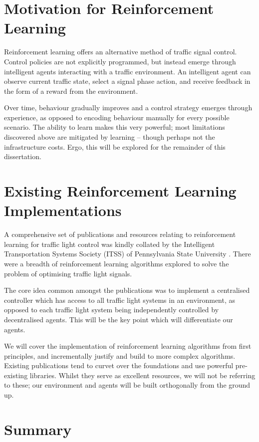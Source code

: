 \documentclass[a4paper]{report}
\begin{document}
\section{Motivation for Reinforcement Learning}

Reinforcement learning offers an alternative method of traffic signal control. Control policies are not explicitly programmed, but instead emerge through intelligent agents interacting with a traffic environment. An intelligent agent can observe current traffic state, select a signal phase action, and receive feedback in the form of a reward from the environment.

Over time, behaviour gradually improves and a control strategy emerges through experience, as opposed to encoding behaviour manually for every possible scenario. The ability to learn makes this very powerful; most limitations discovered above are mitigated by learning -- though perhaps not the infrastructure costs. Ergo, this will be explored for the remainder of this dissertation.

\section{Existing Reinforcement Learning Implementations}

A comprehensive set of publications and resources relating to reinforcement learning for traffic light control was kindly collated by the Intelligent Transportation Systems Society (ITSS) of Pennsylvania State University \cite{ITSS2020}. There were a breadth of reinforcement learning algorithms explored to solve the problem of optimising traffic light signals.

The core idea common amongst the publications was to implement a centralised controller which has access to all traffic light systems in an environment, as opposed to each traffic light system being independently controlled by decentralised agents. This will be the key point which will differentiate our agents.

We will cover the implementation of reinforcement learning algorithms from first principles, and incrementally justify and build to more complex algorithms. Existing publications tend to curvet over the foundations and use powerful pre-existing libraries. Whilst they serve as excellent resources, we will not be referring to these; our environment and agents will be built orthogonally from the ground up.

\section{Summary}
\end{document}

